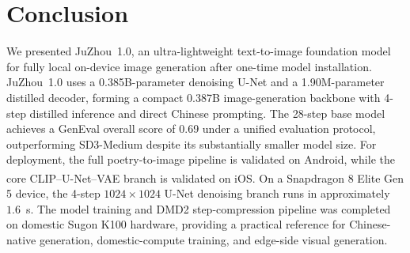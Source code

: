 \section{Conclusion}
We presented JuZhou~1.0, an ultra-lightweight text-to-image foundation model for fully local on-device image generation after one-time model installation. JuZhou~1.0 uses a 0.385B-parameter denoising U-Net and a 1.90M-parameter distilled decoder, forming a compact 0.387B image-generation backbone with 4-step distilled inference and direct Chinese prompting. The 28-step base model achieves a GenEval overall score of 0.69 under a unified evaluation protocol, outperforming SD3-Medium despite its substantially smaller model size. For deployment, the full poetry-to-image pipeline is validated on Android, while the core CLIP--U-Net--VAE branch is validated on iOS. On a Snapdragon\textsuperscript{\textregistered} 8 Elite Gen 5 device, the 4-step $1024 \times 1024$ U-Net denoising branch runs in approximately $1.6$~s. The model training and DMD2 step-compression pipeline was completed on domestic Sugon K100 hardware, providing a practical reference for Chinese-native generation, domestic-compute training, and edge-side visual generation.

